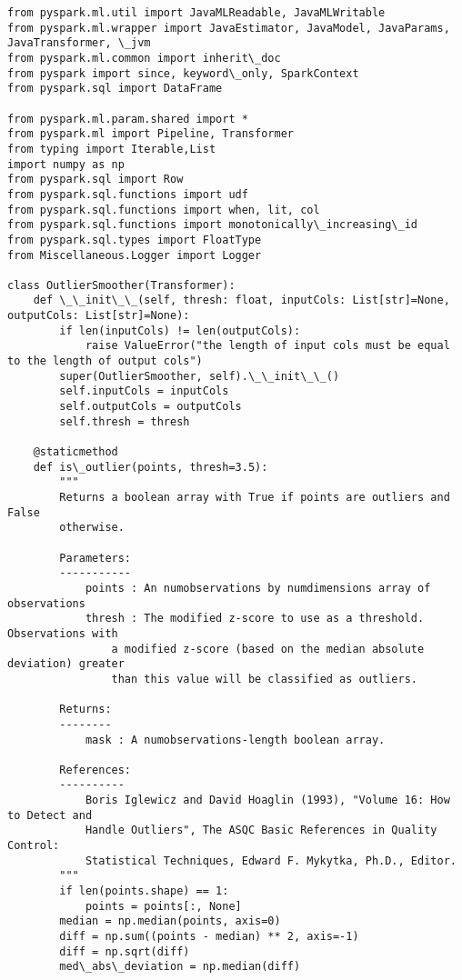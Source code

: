 \documentclass[11pt]{article}
\begin{document}
    \begin{Verbatim}[commandchars=\\\{\}]
from pyspark.ml.util import JavaMLReadable, JavaMLWritable
from pyspark.ml.wrapper import JavaEstimator, JavaModel, JavaParams, JavaTransformer, \_jvm
from pyspark.ml.common import inherit\_doc
from pyspark import since, keyword\_only, SparkContext
from pyspark.sql import DataFrame

from pyspark.ml.param.shared import *
from pyspark.ml import Pipeline, Transformer
from typing import Iterable,List
import numpy as np
from pyspark.sql import Row
from pyspark.sql.functions import udf
from pyspark.sql.functions import when, lit, col
from pyspark.sql.functions import monotonically\_increasing\_id
from pyspark.sql.types import FloatType
from Miscellaneous.Logger import Logger

class OutlierSmoother(Transformer):
    def \_\_init\_\_(self, thresh: float, inputCols: List[str]=None, outputCols: List[str]=None):
        if len(inputCols) != len(outputCols):
            raise ValueError("the length of input cols must be equal to the length of output cols")
        super(OutlierSmoother, self).\_\_init\_\_()
        self.inputCols = inputCols
        self.outputCols = outputCols
        self.thresh = thresh

    @staticmethod
    def is\_outlier(points, thresh=3.5):
        """
        Returns a boolean array with True if points are outliers and False
        otherwise.

        Parameters:
        -----------
            points : An numobservations by numdimensions array of observations
            thresh : The modified z-score to use as a threshold. Observations with
                a modified z-score (based on the median absolute deviation) greater
                than this value will be classified as outliers.

        Returns:
        --------
            mask : A numobservations-length boolean array.

        References:
        ----------
            Boris Iglewicz and David Hoaglin (1993), "Volume 16: How to Detect and
            Handle Outliers", The ASQC Basic References in Quality Control:
            Statistical Techniques, Edward F. Mykytka, Ph.D., Editor.
        """
        if len(points.shape) == 1:
            points = points[:, None]
        median = np.median(points, axis=0)
        diff = np.sum((points - median) ** 2, axis=-1)
        diff = np.sqrt(diff)
        med\_abs\_deviation = np.median(diff)


\end{Verbatim}
\end{document}
